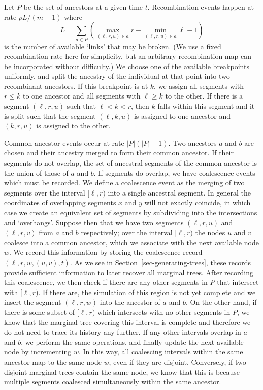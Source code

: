 \documentclass[10pt]{article}
\begin{document}
Let $P$ be the set of ancestors at a given time $t$. Recombination events
happen at rate $\rho L / (m - 1)$ where
\[
L = \sum_{a \in P}\left( \max_{(\ell, r, u) \in a}r
    - \min_{(\ell, r, u) \in a}\ell - 1 \right)
\]
is the number of available `links' that may be broken. (We use a fixed
recombination rate here for simplicity, but an arbitrary recombination
map can be incorporated without difficulty.) We choose one of the
available breakpoints uniformly, and split the ancestry of the individual at that point
into two recombinant ancestors. If this breakpoint is at $k$, we assign all
segments with $r \leq k$ to one ancestor and all segments with $\ell \geq k$ to
the other. If there is a segment $(\ell, r, u)$ such that $\ell < k < r$,
then $k$ falls within this segment and it is split
such that the segment $(\ell, k, u)$ is assigned to one ancestor and
$(k, r, u)$ is assigned to the other.

Common ancestor events occur at rate $|P|(|P| - 1)$. Two ancestors $a$ and $b$
are chosen and their ancestry merged to form their common ancestor. If their
segments do not overlap, the set of ancestral segments of the common ancestor is
the union of those of $a$ and $b$. If segments do overlap, we have coalescence
events which must be recorded. We define a coalescence event as the merging of two
segments over the interval $[\ell, r)$ into a single ancestral segment. In
general the coordinates of overlapping segments $x$ and $y$ will not exactly
coincide, in which case we create an equivalent set of segments by
subdividing into the intersections and `overhangs'. Suppose then that we
have two segments $(\ell, r, u)$ and $(\ell, r, v)$ from $a$ and $b$
respectively; over the interval $[\ell, r)$ the nodes $u$ and $v$ coalesce into
a common ancestor, which we associate with the next available node $w$. We
record this information by storing the coalescence record $\left(\ell, r, w,
(u, v), t\right)$. As we see in Section~\ref{sec-generating-trees}, these
records provide sufficient information to later recover all marginal trees.
After recording this coalescence, we then check if there are any other segments
in $P$ that intersect with $[\ell, r)$. If there are, the simulation of this
region is not yet complete and we insert the segment $(\ell, r, w)$ into the
ancestor of $a$ and $b$. On the other hand, if there is some subset of $[\ell,
r)$ which intersects with no other segments in $P$, we know that the marginal
tree covering this interval is complete and therefore we do not need to trace
its history any further. If any other intervals overlap in $a$ and $b$, we
perform the same operations, and finally update the next available node by
incrementing $w$. In this way, all coalescing intervals within the same
ancestor map to the same node $w$, even if they are disjoint. Conversely, if
two  disjoint marginal trees contain the same node, we know that this is
because multiple segments coalesced simultaneously within the same ancestor.
\end{document}
